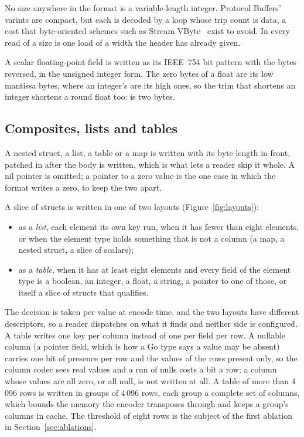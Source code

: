 No size anywhere in the format is a variable-length integer. Protocol
Buffers' varints are compact, but each is decoded by a loop whose trip count
is data, a cost that byte-oriented schemes such as Stream
VByte~\cite{lemire2018streamvbyte} exist to avoid. In \colbin{} every read of
a size is one load of a width the header has already given.

A scalar floating-point field is written as its IEEE~754 bit pattern with the
bytes reversed, in the unsigned integer form. The zero bytes of a float are
its low mantissa bytes, where an integer's are its high ones, so the trim that
shortens an integer shortens a round float too:  is two bytes.

\subsection{Composites, lists and tables}

A nested struct, a list, a table or a map is written with its byte length in
front, patched in after the body is written, which is what lets a reader skip
it whole. A nil pointer is omitted; a pointer to a zero value is the one case
in which the format writes a zero, to keep the two apart.

A slice of structs is written in one of two layouts
(Figure~\ref{fig:layouts}):
\begin{itemize}
\item as a \emph{list}, each element its own key run, when it has fewer than
  eight elements, or when the element type holds something that is not a
  column (a map, a nested struct, a slice of scalars);
\item as a \emph{table}, when it has at least eight elements and every field
  of the element type is a boolean, an integer, a float, a string, a pointer
  to one of those, or itself a slice of structs that qualifies.
\end{itemize}
The decision is taken per value at encode time, and the two layouts have
different descriptors, so a reader dispatches on what it finds and neither
side is configured. A table writes one key per column instead of one per field
per row. A nullable column (a pointer field, which is how a Go type says a value
may be absent) carries one bit of presence per row and the values of the rows
present only, so the column codec sees real values and a run of nulls costs a
bit a row; a column whose values are all zero, or all null, is not written at
all. A table of more than 4\,096 rows is
written in groups of 4\,096 rows, each group a complete set of columns, which
bounds the memory the encoder transposes through and keeps a group's columns
in cache. The threshold of eight rows is the subject of the first ablation in
Section~\ref{sec:ablations}.


